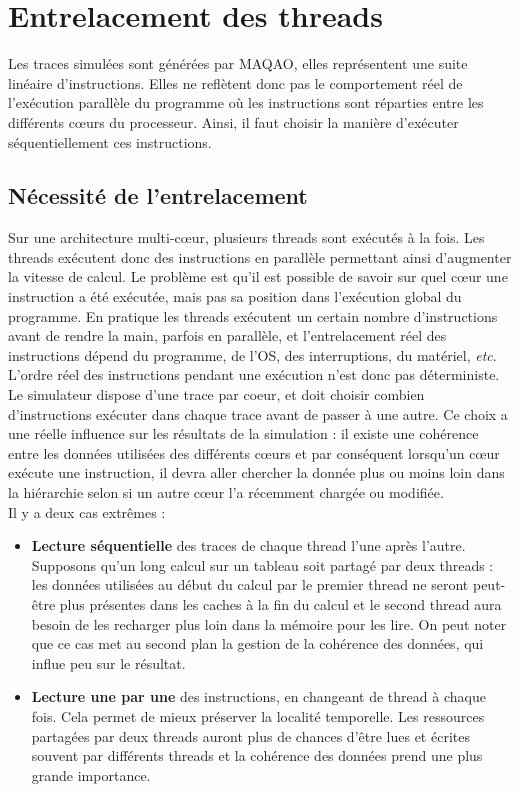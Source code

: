 \section{Entrelacement des threads}

Les traces simulées sont générées par \textsf{MAQAO}, elles représentent une suite linéaire d'instructions. Elles ne reflètent donc pas le comportement réel de l'exécution parallèle du programme où les instructions sont réparties entre les différents c\oe urs du processeur. Ainsi, il faut choisir la manière d'exécuter séquentiellement ces instructions.

\subsection{Nécessité de l'entrelacement}

Sur une architecture multi-c{\oe}ur, plusieurs threads sont exécutés à la fois. Les threads exécutent donc des instructions en parallèle permettant ainsi d'augmenter la vitesse de calcul. Le problème est qu'il est possible de savoir sur quel c\oe ur une instruction a été exécutée, mais pas sa position dans l'exécution global du programme. En pratique les threads exécutent un certain nombre d'instructions avant de rendre la main, parfois en parallèle, et l'entrelacement réel des instructions dépend du programme, de l'OS, des interruptions, du matériel, \emph{etc}. L'ordre réel des instructions pendant une exécution n'est donc pas déterministe.\\

Le simulateur dispose d'une trace par coeur, et doit choisir combien d'instructions exécuter dans chaque trace avant de passer à une autre. Ce choix a une réelle influence sur les résultats de la simulation : il existe une cohérence entre les données utilisées des différents c\oe urs et par conséquent lorsqu'un c\oe ur exécute une instruction, il devra aller chercher la donnée plus ou moins loin dans la hiérarchie selon si un autre c\oe ur l'a récemment chargée ou modifiée. \\

Il y a deux cas extrêmes :

\begin{itemize}
  \item \textbf{Lecture séquentielle} des traces de chaque thread l'une après l'autre. Supposons qu'un long calcul sur un tableau soit partagé par deux threads : les données utilisées au début du calcul par le premier thread ne seront peut-être plus présentes dans les caches à la fin du calcul et le second thread aura besoin de les recharger plus loin dans la mémoire pour les lire. On peut noter que ce cas met au second plan la gestion de la cohérence des données, qui influe peu sur le résultat.
  \item \textbf{Lecture une par une} des instructions, en changeant de thread à chaque fois. Cela permet de mieux préserver la localité temporelle. Les ressources partagées par deux threads auront plus de chances d'être lues et écrites souvent par différents threads et la cohérence des données prend une plus grande importance.
\end{itemize} 


